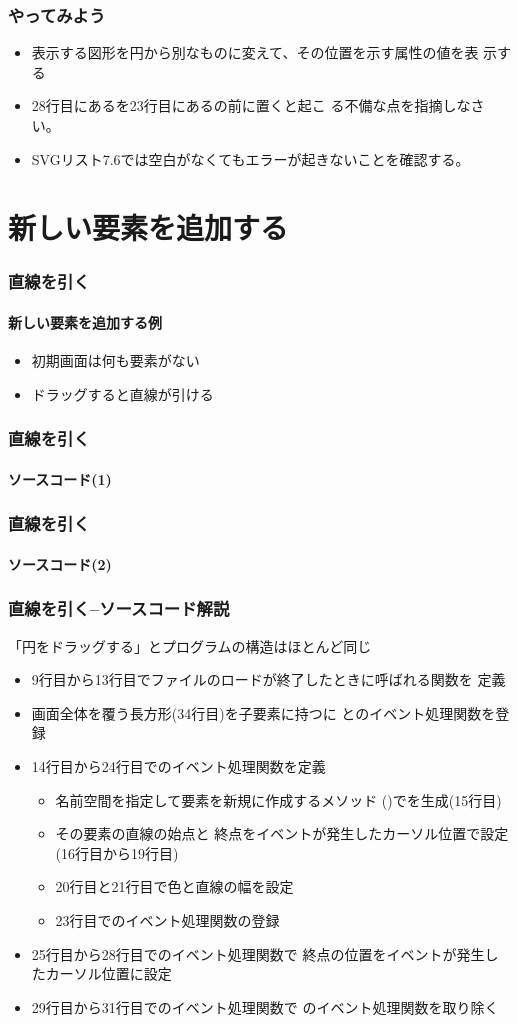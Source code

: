 \begin{frame}
 \frametitle{やってみよう}
 \begin{itemize}
	\item 表示する図形を円から別なものに変えて、その位置を示す属性の値を表
				示する
	\item 28行目にあるを23行目にあるの前に置くと起こ
				る不備な点を指摘しなさい。
  \item SVGリスト7.6では空白がなくてもエラーが起きないことを確認する。
 \end{itemize}
\end{frame}
 \section{新しい要素を追加する}
\begin{frame}[containsverbatim]
 \frametitle{直線を引く}
 \framesubtitle{新しい要素を追加する例}
 \begin{itemize}
  \item 初期画面は何も要素がない
  \item ドラッグすると直線が引ける
 \end{itemize}
 \end{frame}
\begin{frame}[containsverbatim]
 \frametitle{直線を引く}
 \framesubtitle{ソースコード(1)}
\end{frame}
\begin{frame}[containsverbatim]
 \frametitle{直線を引く}
 \framesubtitle{ソースコード(2)}
\end{frame}
\begin{frame}[containsverbatim]
 \frametitle{直線を引く--ソースコード解説}
 「円をドラッグする」とプログラムの構造はほとんど同じ
 \begin{itemize}
  \item 9行目から13行目でファイルのロードが終了したときに呼ばれる関数を
        定義
  \item 画面全体を覆う長方形(34行目)を子要素に持つに
           とのイベント処理関数を登録
  \item 14行目から24行目でのイベント処理関数を定義
    \begin{itemize}
     \item 名前空間を指定して要素を新規に作成するメソッド
           ()でを生成(15行目)
     \item その要素の直線の始点と
           終点をイベントが発生したカーソル位置で設定(16行目から19行目)
     \item 20行目と21行目で色と直線の幅を設定
     \item 23行目でのイベント処理関数の登録
    \end{itemize}
  \item 25行目から28行目でのイベント処理関数で
        終点の位置をイベントが発生したカーソル位置に設定
  \item 29行目から31行目でのイベント処理関数で
        のイベント処理関数を取り除く
 \end{itemize}
\end{frame}
